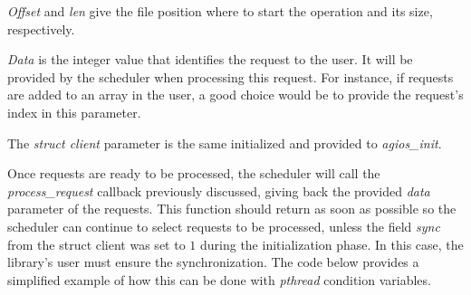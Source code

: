 \emph{Offset} and \emph{len} give the file position where to start the operation and its size, respectively.

\emph{Data} is the integer value that identifies the request to the user. It will be provided by the scheduler when processing this request. For instance, if requests are added to an array in the user, a good choice would be to provide the request's index in this parameter.

The \emph{struct client} parameter is the same initialized and provided to \emph{agios\_init}.

Once requests are ready to be processed, the scheduler will call the \emph{process\_request} callback previously discussed, giving back the provided \emph{data} parameter of the requests. This function should return as soon as possible so the scheduler can continue to select requests to be processed, unless the field \emph{sync} from the struct client was set to $1$ during the initialization phase. In this case, the library's user must ensure the synchronization. The code below provides a simplified example of how this can be done with \emph{pthread} condition variables.

